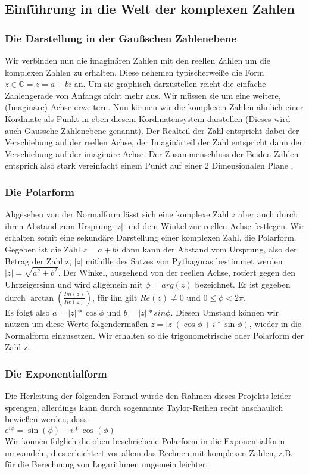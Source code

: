 \documentclass[a4paper, 12pt]{article}
\begin{document}
\subsection{Einführung in die Welt der komplexen Zahlen}

\subsubsection{Die Darstellung in der Gaußschen Zahlenebene}
Wir verbinden nun die imaginären Zahlen mit den reellen Zahlen um die komplexen Zahlen zu erhalten. Diese nehemen typischerweiße die Form $ z \in \mathbb{C}= z = a + bi$ an.
Um sie graphisch darzustellen reicht die einfache Zahlengerade von Anfangs nicht mehr aus. Wir müssen sie um eine weitere, (Imaginäre) Achse erweitern.
Nun können wir die komplexen Zahlen ähnlich einer Kordinate als Punkt in eben diesem Kordinatensystem darstellen (Dieses wird auch Gaussche Zahlenebene genannt). Der Realteil der Zahl entspricht dabei der Verschiebung auf der reellen Achse, der Imaginärteil der Zahl entspricht dann der Verschiebung auf der imaginäre Achse. \cite{book_mod}
Der Zusammenschluss der Beiden Zahlen entsprich also stark vereinfacht einem Punkt auf einer 2 Dimensionalen Plane \cite{book_alt}.


\subsubsection{Die Polarform}
Abgesehen von der Normalform lässt sich eine komplexe Zahl $z$ aber auch durch ihren Abstand zum Ursprung $|z|$ und dem Winkel zur reellen Achse festlegen.
Wir erhalten somit eine sekundäre Darstellung einer komplexen Zahl, die Polarform.
Gegeben ist die Zahl $z = a +bi$ dann kann der Abstand vom Ursprung, also der Betrag der Zahl z, $|z|$ mithilfe des Satzes von Pythagoras bestimmet werden $|z| = \sqrt{a^2 +b^2}$.
Der Winkel, ausgehend von der reellen Achse, rotiert gegen den Uhrzeigersinn und wird allgemein mit $\phi = arg(z)$ bezeichnet.
Er ist gegeben durch $\arctan{ (\frac{Im(z)}{Re(z)})}$, für ihn gilt $Re(z) \neq 0$ und $0 \leq \phi < 2\pi$. \\
Es folgt also $a = |z| * \cos{\phi}$ und $b = |z| * sin{\phi}$.
Diesen Umstand können wir nutzen um diese Werte folgendermaßen $ z = |z|(\cos{\phi} + i * \sin{\phi})$, wieder in die Normalform einzusetzen.
Wir erhalten so die trigonometrische oder Polarform der Zahl z. \cite{book_mod}

\subsubsection{Die Exponentialform}
Die Herleitung der folgenden Formel würde den Rahmen dieses Projekts leider sprengen, allerdings kann durch sogennante Taylor-Reihen \cite{tay_ser} recht anschaulich bewießen werden, dass: \\
$e^{i \phi} = \sin{(\phi)} + i * \cos{(\phi)}$ \\
Wir können folglich die oben beschriebene Polarform in die Exponentialform umwandeln, dies erleichtert vor allem das Rechnen mit komplexen Zahlen, z.B. für die Berechnung von Logarithmen ungemein leichter.
\end{document}
